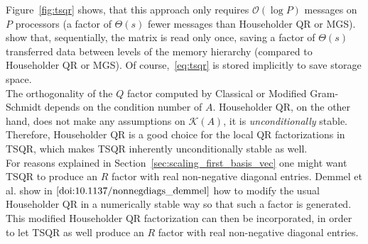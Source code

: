 \documentclass{scrartcl}
\numberwithin{equation}{section}
\begin{document}
Figure~\ref{fig:tsqr} shows, that this approach only requires $\mathcal{O}(\log P)$ messages on $P$ processors (a factor of $\Theta (s)$ fewer messages than Householder QR or MGS). \cite{Demmel:2012:CA-QR_demmel} show that, sequentially, the matrix is read only once, saving a factor of $\Theta(s)$ transferred data between levels of the memory hierarchy (compared to Householder QR or MGS). 
Of course,~\eqref{eq:tsqr} is stored implicitly to save storage space.\\
The orthogonality of the $Q$ factor computed by Classical or Modified Gram-Schmidt depends on the condition number of $A$. Householder QR, on the other hand, does not make any assumptions on $\mathcal{K}(A)$, it is \textit{unconditionally} stable. Therefore, Householder QR is a good choice for the local QR factorizations in TSQR, which makes TSQR inherently unconditionally stable as well.\\

For reasons explained in Section~\ref{sec:scaling_first_basis_vec} one might want TSQR to produce an $R$ factor with real non-negative diagonal entries. Demmel et al. show in $\cite{doi:10.1137/nonnegdiags_demmel} $ how to modify the usual Householder QR in a numerically stable way so that such a factor is generated. This modified Householder QR factorization can then be incorporated, in order to let TSQR as well produce an $R$ factor with real non-negative diagonal entries.
\end{document}
